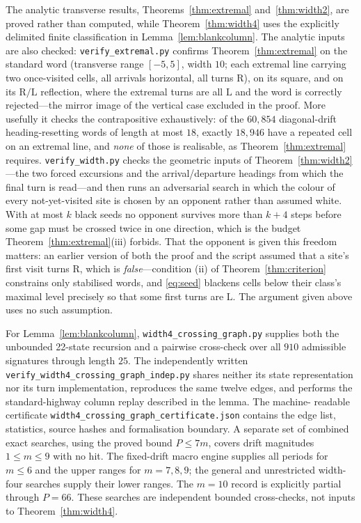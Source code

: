 \documentclass[11pt,reqno]{amsart}
\theoremstyle{plain}
\theoremstyle{definition}
\newcommand{\turnR}{\mathrm{R}}
\newcommand{\turnL}{\mathrm{L}}
\begin{document}
The analytic transverse results, Theorems~\ref{thm:extremal}
and~\ref{thm:width2}, are proved rather than computed, while
Theorem~\ref{thm:width4} uses the explicitly delimited finite classification in
Lemma~\ref{lem:blankcolumn}.  The analytic inputs are also checked:
\texttt{verify\_extremal.py} confirms
Theorem~\ref{thm:extremal} on the standard word (transverse range $[-5,5]$, width
$10$; each extremal line carrying two once-visited cells, all arrivals horizontal,
all turns $\turnR$), on its square, and on its $\turnR/\turnL$ reflection, where the
extremal turns are all $\turnL$ and the word is correctly rejected---the mirror image
of the vertical case excluded in the proof. More usefully it checks the
contrapositive exhaustively: of the $60{,}854$ diagonal-drift heading-resetting words
of length at most $18$, exactly $18{,}946$ have a repeated cell on an extremal line,
and \emph{none} of those is realisable, as Theorem~\ref{thm:extremal} requires.
\texttt{verify\_width.py} checks the geometric inputs of Theorem~\ref{thm:width2}---the
two forced excursions and the arrival/departure headings from which the final turn is
read---and then runs an adversarial search in which the colour of every
not-yet-visited site is chosen by an opponent rather than assumed white. With at most
$k$ black seeds no opponent survives more than $k+4$ steps before some gap must be
crossed twice in one direction, which is the budget Theorem~\ref{thm:extremal}(iii)
forbids. That the opponent is given this freedom matters: an earlier version of both
the proof and the script assumed that a site's first visit turns $\turnR$, which is
\emph{false}---condition (ii) of Theorem~\ref{thm:criterion} constrains only
stabilised words, and \eqref{eq:seed} blackens cells below their class's maximal
level precisely so that some first turns are $\turnL$. The argument given above uses
no such assumption.

For Lemma~\ref{lem:blankcolumn}, \texttt{width4\_crossing\_graph.py} supplies both
the unbounded 22-state recursion and a pairwise cross-check over all $910$ admissible
signatures through length $25$.  The independently written
\texttt{verify\_width4\_crossing\_graph\_indep.py} shares neither its state
representation nor its turn implementation, reproduces the same twelve edges, and
performs the standard-highway column replay described in the lemma.  The machine-
readable certificate \texttt{width4\_crossing\_graph\_certificate.json} contains the
edge list, statistics, source hashes and formalisation boundary.  A separate
set of combined exact searches, using the proved bound $P\le7m$, covers drift
magnitudes $1\le m\le9$ with no hit.  The fixed-drift macro engine supplies all
periods for $m\le6$ and the upper ranges for $m=7,8,9$; the general and unrestricted
width-four searches supply their lower ranges.  The $m=10$ record is explicitly
partial through $P=66$.  These searches are independent bounded cross-checks, not inputs to
Theorem~\ref{thm:width4}.
\end{document}
